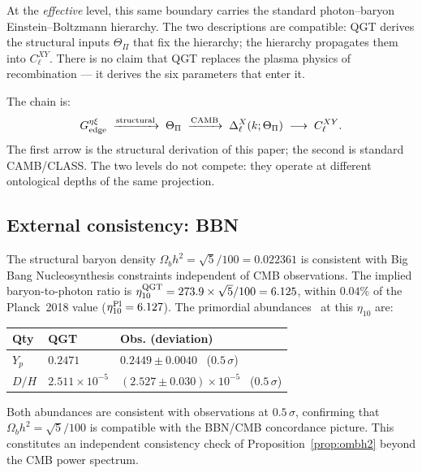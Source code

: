 \documentclass[twocolumn,10pt]{article}
\begin{document}
At the \emph{effective} level, this same boundary carries the
standard photon--baryon Einstein--Boltzmann hierarchy.
The two descriptions are compatible:
QGT derives the structural inputs $\Theta_\Pi$ that fix the
hierarchy; the hierarchy propagates them into $C_\ell^{XY}$.
There is no claim that QGT replaces the plasma physics of
recombination — it derives the six parameters that enter it.

The chain is:
\begin{equation}
  G^{\eta\xi}_{\rm edge}
  \;\xrightarrow{\text{structural}}\;
  \Theta_\Pi
  \;\xrightarrow{\text{CAMB}}\;
  \Delta_\ell^X(k;\Theta_\Pi)
  \;\longrightarrow\;
  C_\ell^{XY}.
  \label{eq:two_levels_chain}
\end{equation}
The first arrow is the structural derivation of this paper;
the second is standard CAMB/CLASS.
The two levels do not compete: they operate at different ontological
depths of the same projection.

\subsection{External consistency: BBN}
\label{sec:bbn}

The structural baryon density $\Omega_bh^2=\sqrt{5}/100=0.022361$
is consistent with Big Bang Nucleosynthesis constraints independent
of CMB observations.
The implied baryon-to-photon ratio is
$\eta_{10}^{\rm QGT}=273.9\times\sqrt{5}/100=6.125$,
within $0.04\%$ of the Planck~2018 value ($\eta_{10}^{\rm Pl}=6.127$).
The primordial abundances~\cite{Cyburt2016} at this $\eta_{10}$ are:
\begin{center}
\footnotesize\renewcommand{\arraystretch}{1.2}
\begin{tabular}{p{1.5cm}p{2.6cm}p{3.3cm}}
\toprule
Qty & QGT & Obs. (deviation) \\
\midrule
$Y_p$ & $0.2471$ & $0.2449\pm0.0040$~\cite{Aver2015} ($0.5\,\sigma$) \\
$D/H$ & $2.511\!\times\!10^{-5}$ & $(2.527\!\pm\!0.030)\!\times\!10^{-5}$~\cite{Cooke2018} ($0.5\,\sigma$) \\
\bottomrule
\end{tabular}
\end{center}
Both abundances are consistent with observations at $0.5\,\sigma$,
confirming that $\Omega_bh^2=\sqrt{5}/100$ is compatible with the
BBN/CMB concordance picture.
This constitutes an independent consistency check of
Proposition~\ref{prop:ombh2} beyond the CMB power spectrum.
\end{document}
